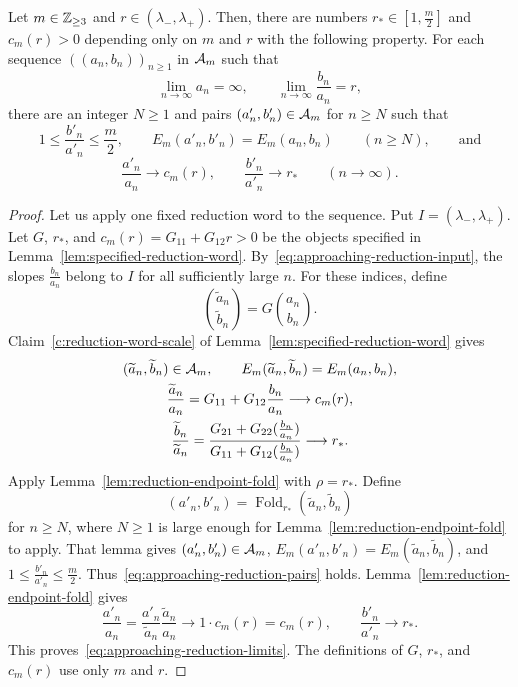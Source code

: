 \begin{lemma}\label{lem:approaching-dimension-reduction}
Let $m\in\mathbb Z_{\ge3}$ and $r\in(\lambda_-,\lambda_+)$.
Then, there are numbers $r_*\in[1,\frac m2]$ and $c_m(r)>0$ depending only on $m$ and $r$ with the following property.
For each sequence $((a_n,b_n))_{n\ge1}$ in $\mathcal A_m$ such that
\begin{equation}\label{eq:approaching-reduction-input}
 \lim_{n\to\infty}a_n=\infty,\qquad
 \lim_{n\to\infty}\frac{b_n}{a_n}=r,
\end{equation}
there are an integer $N\ge1$ and pairs $(a'_n,b'_n)\in\mathcal A_m$ for $n\ge N$ such that
\begin{equation}\label{eq:approaching-reduction-pairs}
 1\le\frac{b'_n}{a'_n}\le\frac m2,\qquad
 E_m(a'_n,b'_n)=E_m(a_n,b_n)\qquad(n\ge N),\qquad\text{and}
\end{equation}
\begin{equation}\label{eq:approaching-reduction-limits}
 \frac{a'_n}{a_n}\longrightarrow c_m(r),\qquad
 \frac{b'_n}{a'_n}\longrightarrow r_*\qquad(n\longrightarrow\infty).
\end{equation}
\end{lemma}
\begin{proof}
Let us apply one fixed reduction word to the sequence.
Put $I=(\lambda_-,\lambda_+)$. Let $G$, $r_*$, and $c_m(r)=G_{11}+G_{12}r>0$ be the objects specified in Lemma~\ref{lem:specified-reduction-word}. By~\eqref{eq:approaching-reduction-input}, the slopes $\frac{b_n}{a_n}$ belong to $I$ for all sufficiently large $n$. For these indices, define
\[
 \binom{\widetilde a_n}{\widetilde b_n}=G\binom{a_n}{b_n}.
\]
Claim~\ref{c:reduction-word-scale} of Lemma~\ref{lem:specified-reduction-word} gives
\[
 \begin{gathered}
 (\widetilde a_n,\widetilde b_n)\in\mathcal A_m,
 \qquad E_m(\widetilde a_n,\widetilde b_n)=E_m(a_n,b_n),\\
 \frac{\widetilde a_n}{a_n}
 =G_{11}+G_{12}\frac{b_n}{a_n}\longrightarrow c_m(r),\\
 \frac{\widetilde b_n}{\widetilde a_n}
 =\frac{G_{21}+G_{22}(\frac{b_n}{a_n})}{G_{11}+G_{12}(\frac{b_n}{a_n})}
 \longrightarrow r_*.
 \end{gathered}
\]
Apply Lemma~\ref{lem:reduction-endpoint-fold} with $\rho=r_*$. Define
\[
 (a'_n,b'_n)=\operatorname{Fold}_{r_*}(\widetilde a_n,\widetilde b_n)
\]
for $n\ge N$, where $N\ge1$ is large enough for Lemma~\ref{lem:reduction-endpoint-fold} to apply. That lemma gives $(a'_n,b'_n)\in\mathcal A_m$, $E_m(a'_n,b'_n)=E_m(\widetilde a_n,\widetilde b_n)$, and $1\le\frac{b'_n}{a'_n}\le\frac m2$. Thus~\eqref{eq:approaching-reduction-pairs} holds. Lemma~\ref{lem:reduction-endpoint-fold} gives
\[
 \frac{a'_n}{a_n}
 =\frac{a'_n}{\widetilde a_n}\frac{\widetilde a_n}{a_n}
 \longrightarrow1\cdot c_m(r)=c_m(r),
 \qquad \frac{b'_n}{a'_n}\longrightarrow r_*.
\]
This proves~\eqref{eq:approaching-reduction-limits}. The definitions of $G$, $r_*$, and $c_m(r)$ use only $m$ and $r$.
\end{proof}

